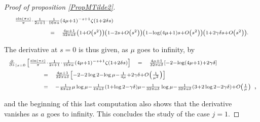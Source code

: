 \documentclass{jams-l}
\theoremstyle{definition}
\theoremstyle{remark}
\numberwithin{equation}{section}
\begin{document}
\begin{proof}[Proof of proposition \ref{PropMTilde2}]
                        \[ \begin{array}{lll}
                                \multicolumn{3}{l}{\scriptstyle \frac{\sin \left( \pi s \right)}{\pi} \cdot \frac{1}{2s+1} \cdot \frac{1}{16 \pi a} \left( 4 \mu + 1 \right)^{-s+1} \zeta \left( 1 + 2 \delta s \right)} \\[0.5em]
                                
                                \qquad \qquad & \scriptstyle = & \scriptstyle \frac{4 \mu + 1}{32 \pi a \delta} \left( 1 + O \left( s^2 \right) \right) \left( 1 - 2 s + O \left( s^2 \right) \right) \left( 1 - \log \left( 4 \mu + 1 \right) s + O \left( s^2 \right) \right) \left( 1 + 2 \gamma \delta s + O \left( s^2 \right) \right).
                            \end{array} \]
                        
                        \noindent The derivative at $s=0$ is thus given, as $\mu$ goes to infinity, by
                        \[ \begin{array}{lllll}
                                \multicolumn{3}{l}{\scriptstyle \frac{\partial}{\partial s}_{\left \vert s = 0 \right.} \left[ \frac{\sin \left( \pi s \right)}{\pi} \cdot \frac{1}{2s+1} \cdot \frac{1}{16 \pi a} \left( 4 \mu + 1 \right)^{-s+1} \zeta \left( 1 + 2 \delta s \right) \right]} & \scriptstyle = & \scriptstyle \frac{4 \mu + 1}{32 \pi a \delta} \left[ - 2 - \log \left( 4 \mu + 1 \right) + 2 \gamma \delta \right] \\[0.5em]
                                
                                \qquad \qquad & \scriptstyle = & \multicolumn{3}{l}{\scriptstyle \frac{4 \mu + 1}{32 \pi a \delta} \left[ - 2 - 2 \log 2 - \log \mu - \frac{1}{4 \mu} + 2 \gamma \delta + O \left( \frac{1}{\mu^2} \right) \right]} \\[0.5em]
                                
                                & \scriptstyle = & \multicolumn{3}{l}{\scriptstyle - \frac{1}{8 \pi a \delta} \mu \log \mu - \frac{1}{4 \pi a \delta} \left( 1 + \log 2 - \gamma \delta \right) \mu - \frac{1}{32 \pi a \delta} \log \mu - \frac{1}{32 \pi a \delta} \left( 3 + 2 \log 2 - 2 \gamma \delta \right) + O \left( \frac{1}{\mu} \right)},
                            \end{array} \]
                        
                        \noindent and the beginning of this last computation also shows that the derivative vanishes as $a$ goes to infinity. This concludes the study of the case $j = 1$.
                        

\end{proof}
\end{document}
